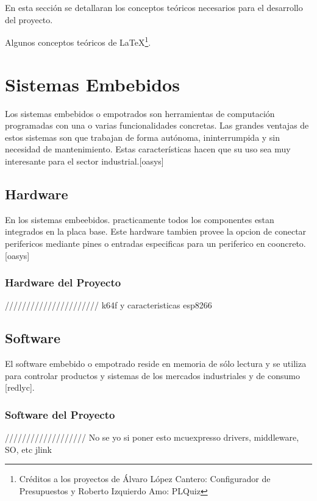 
En esta sección se detallaran los conceptos teóricos necesarios para el desarrollo del proyecto. 

Algunos conceptos teóricos de \LaTeX \footnote{Créditos a los proyectos de Álvaro López Cantero: Configurador de Presupuestos y Roberto Izquierdo Amo: PLQuiz}.

\section{Sistemas Embebidos}

Los sistemas embebidos o empotrados son herramientas de computación programadas con una o varias funcionalidades concretas. 
Las grandes ventajas de estos sistemas son que trabajan de forma autónoma, ininterrumpida y sin necesidad de mantenimiento. Estas características hacen que su uso sea muy interesante para el sector industrial.[oasys]

\subsection{Hardware}

En los sistemas embeebidos. practicamente todos los componentes estan integrados en la placa base. Este hardware tambien provee la opcion de conectar perifericos mediante pines o entradas especificas para un periferico en cooncreto.[oasys] 

\subsubsection{Hardware del Proyecto}

//////////////////////
k64f y caracteristicas
esp8266

\subsection{Software}

El software embebido o empotrado reside en memoria de sólo lectura y se utiliza para controlar productos y sistemas de los mercados industriales y de consumo [redlyc].

\subsubsection{Software del Proyecto}

/////////////////// No se yo si poner esto
mcuexpresso
drivers, middleware, SO, etc
jlink


